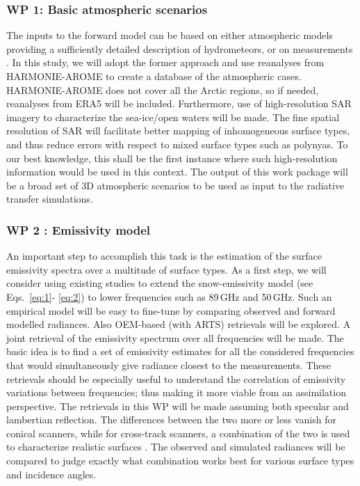 \documentclass[12pt,oneside,a4paper]{article}
\begin{document}
\subsubsection*{WP 1: Basic atmospheric scenarios}
%

\label{sec:atmscenes}
The inputs to the forward model can be based on either atmospheric models
providing a sufficiently detailed description of hydrometeors, or on
measurements \citep{ekelund:using:20}. In this study, we will adopt the former
approach and use reanalyses from HARMONIE-AROME to create a database of the
atmospheric cases. HARMONIE-AROME does not cover all the Arctic regions, so if
needed, reanalyses from ERA5 will be included. Furthermore, use of
high-resolution SAR imagery to characterize the sea-ice/open waters will be
made. The fine spatial resolution of SAR will facilitate better mapping of
inhomogeneous surface types, and thus reduce errors with respect to mixed
surface types such as polynyas. To our best knowledge, this shall be the first
instance where such high-resolution information would be used in this context.
The output of this work package will be a broad set of 3D atmospheric scenarios
to be used as input to the radiative transfer simulations. \vspace{-1.0ex}

\subsubsection*{WP 2 : Emissivity model}
%
\label{sec:emissivity}
An important step to accomplish this task is the estimation of the surface
emissivity spectra over a multitude of surface types. As a first step, we will
consider using existing studies to extend the snow-emissivity model (see
Eqs.~\ref{eq:1}- \ref{eq:2}) to lower frequencies such as 89\,GHz and 50\,GHz.
Such an empirical model will be easy to fine-tune by comparing observed and
forward modelled radiances. Also OEM-based (with ARTS) retrievals will be
explored. A joint retrieval of the emissivity spectrum over all frequencies
will be made. The basic idea is to find a set of emissivity estimates for all
the considered frequencies that would simultaneously give radiance closest to
the measurements. These retrievals should be especially useful to understand
the correlation of emissivity variations between frequencies; thus making it
more viable from an assimilation perspective. The retrievals in this WP will be
made assuming both specular and lambertian reflection. The differences between
the two more or less vanish for conical scanners, while for cross-track
scanners, a combination of the two is used to characterize realistic surfaces
\citep{matzler:2005:onthe}. The observed and simulated radiances will be compared to judge exactly what combination works best for various surface types and incidence angles.
\end{document}
